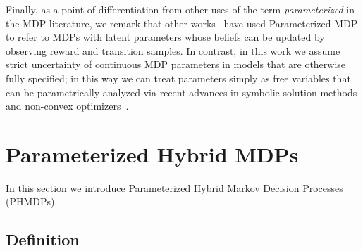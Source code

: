 \documentclass[letterpaper]{article}
\begin{document}
Finally, as a point of differentiation from other uses of the term \emph{parameterized} in the MDP literature, we remark that other works~\cite{Doshi-VelezK16,Duff_UMA_2002,Dearden_UAI_1999,Gopalan_COLT_2015} have used Parameterized MDP to refer to MDPs with latent parameters whose beliefs can be updated by observing reward and transition samples. In contrast, in this work we assume strict uncertainty of continuous MDP parameters in models that are otherwise fully specified; in this way we can treat parameters simply as free variables that can be parametrically analyzed via recent advances in symbolic solution methods and non-convex optimizers~\cite{Gao2013}.

\section{Parameterized Hybrid MDPs}
\label{sec:hybrid_mdps}

In this section we introduce Parameterized Hybrid Markov Decision Processes (PHMDPs).

\subsection{Definition}
\label{sec:phmdp_def}
\end{document}
